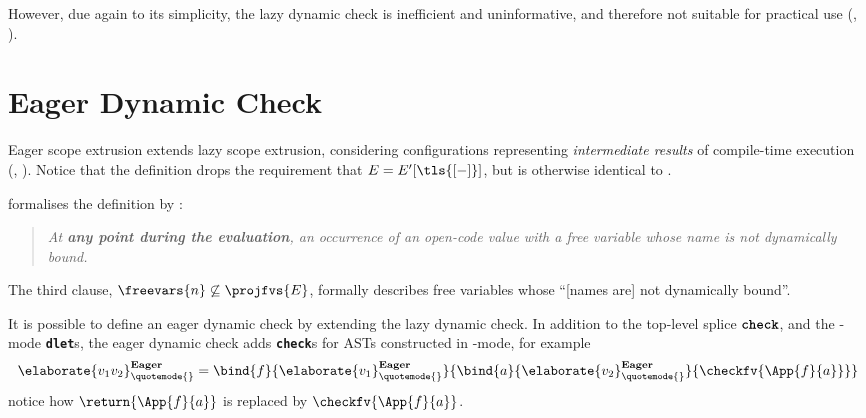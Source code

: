 However, due again to its simplicity, the lazy dynamic check is inefficient and uninformative, and therefore not suitable for practical use \citep{kiselyov-14} (, ).

\section{Eager Dynamic Check}\label{section:eager-dynamic-check-formal}
Eager scope extrusion extends lazy scope extrusion, considering configurations representing \textit{intermediate results} of compile-time execution (, ). Notice that the definition drops the requirement that $E = E'[\tls{[-]}]$, but is otherwise identical to . 



 formalises the definition by \citet{kiselyov-14}:
\begin{quote}
  \textit{At \textbf{any point during the evaluation}, an occurrence of an open-code value with a free variable whose name is not dynamically bound.}
\end{quote}
The third clause, $\freevars{n} \not\subseteq \projfvs{E}$, formally describes free variables whose ``[names are] not dynamically bound''.

It is possible to define an eager dynamic check by extending the lazy dynamic check. In addition to the top-level splice $\textbf{\texttt{check}}$, and the \compilemode{}-mode \textbf{\texttt{dlet}}s, the eager dynamic check adds \textbf{\texttt{check}}s for ASTs constructed in \quotemode{}-mode, for example 
\[\elaborate{v_1 v_2}_{\quotemode{}}^{\textbf{Eager}} = \bind{f}{\elaborate{v_1}_{\quotemode{}}^{\textbf{Eager}}}{\bind{a}{\elaborate{v_2}_{\quotemode{}}^{\textbf{Eager}}}{\checkfv{\App{f}{a}}}}\]
notice how $\return{\App{f}{a}}$ is replaced by $\checkfv{\App{f}{a}}$. 

